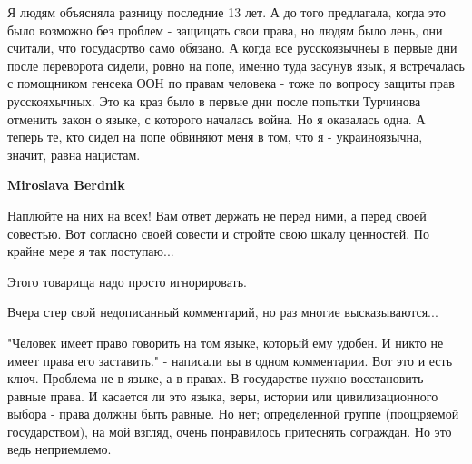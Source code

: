 \begin{itemize}
\begin{itemize}
 

Я людям объясняла разницу последние 13 лет. А до того предлагала, когда это
было возможно без проблем - защищать свои права, но людям было лень, они
считали, что госудасртво само обязано. А когда все русскоязычнеы в первые дни
после переворота сидели, ровно на попе, именно туда засунув язык, я встречалась
с помощником генсека ООН по правам человека - тоже по вопросу защиты прав
русскояхычных. Это ка краз было в первые дни после попытки Турчинова отменить
закон о языке, с которого началась война. Но я оказалась одна. А теперь те, кто
сидел на попе обвиняют меня в том, что я - украиноязычна, значит, равна
нацистам.


 
\textbf{Miroslava Berdnik} 

Наплюйте на них на всех! Вам ответ держать не перед ними, а перед своей
совестью. Вот согласно своей совести и стройте свою шкалу ценностей. По крайне
мере я так поступаю...

\end{itemize}

 
Этого товарища надо просто игнорировать.

 

Вчера стер свой недописанный комментарий, но раз многие высказываются...

"Человек имеет право говорить на том языке, который ему удобен. И никто не
имеет права его заставить." - написали вы в одном комментарии. Вот это и есть
ключ. Проблема не в языке, а в правах. В государстве нужно восстановить равные
права. И касается ли это языка, веры, истории или цивилизационного выбора -
права должны быть равные. Но нет; определенной группе (поощряемой
государством), на мой взгляд, очень понравилось притеснять сограждан. Но это
ведь неприемлемо.


\end{itemize}
